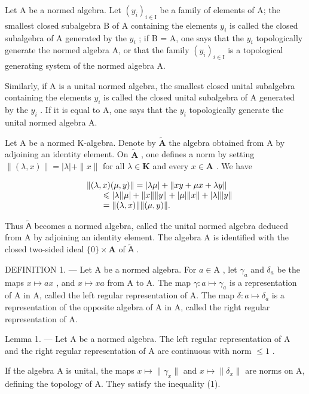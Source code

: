 Let A be a normed algebra. Let \((y_{i})_{i\in\mathrm{I}}\) be a family of elements of A; the smallest closed subalgebra B of A containing the elements \(y_{i}\) is called the closed subalgebra of A generated by the \(y_{i}\) ; if B = A, one says that the \(y_{i}\) topologically generate the normed algebra A, or that the family \((y_{i})_{i\in\mathrm{I}}\) is a topological generating system of the normed algebra A.

Similarly, if A is a unital normed algebra, the smallest closed unital subalgebra containing the elements \(y_{i}\) is called the closed unital subalgebra of A generated by the \(y_{i}\) . If it is equal to A, one says that the \(y_{i}\) topologically generate the unital normed algebra A.

Let A be a normed K-algebra. Denote by \(\tilde{\mathbf{A}}\) the algebra obtained from A by adjoining an identity element. On \(\tilde{\mathbf{A}}\) , one defines a norm by setting \(\| (\lambda ,x)\| = |\lambda | + \| x\|\) for all \(\lambda \in \mathbf{K}\) and every \(x\in \mathbf{A}\) . We have

\[
\begin{array}{r l} & {\| (\lambda , x) (\mu , y) \| = | \lambda \mu | + \| x y + \mu x + \lambda y \|} \\ & {\qquad \leqslant | \lambda | | \mu | + \| x \| \| y \| + | \mu | \| x \| + | \lambda | \| y \|} \\ & {\qquad = \| (\lambda , x) \| \| (\mu , y) \|.} \end{array}
\]

Thus \(\widetilde{\mathsf{A}}\) becomes a normed algebra, called the unital normed algebra deduced from A by adjoining an identity element. The algebra A is identified with the closed two-sided ideal \(\{0\} \times \mathbf{A}\) of \(\widetilde{\mathsf{A}}\) .

DEFINITION 1. --- Let A be a normed algebra. For \(a \in \mathrm{A}\) , let \(\gamma_{a}\) and \(\delta_{a}\) be the maps \(x \mapsto ax\) , and \(x \mapsto xa\) from A to A. The map \(\gamma: a \mapsto \gamma_{a}\) is a representation of A in A, called the left regular representation of A. The map \(\delta: a \mapsto \delta_{a}\) is a representation of the opposite algebra of A in A, called the right regular representation of A.

Lemma 1. --- Let A be a normed algebra. The left regular representation of A and the right regular representation of A are continuous with norm \(\leqslant 1\) .

If the algebra A is unital, the maps \(x \mapsto \|\gamma_{x}\|\) and \(x \mapsto \|\delta_{x}\|\) are norms on A, defining the topology of A. They satisfy the inequality (1).

